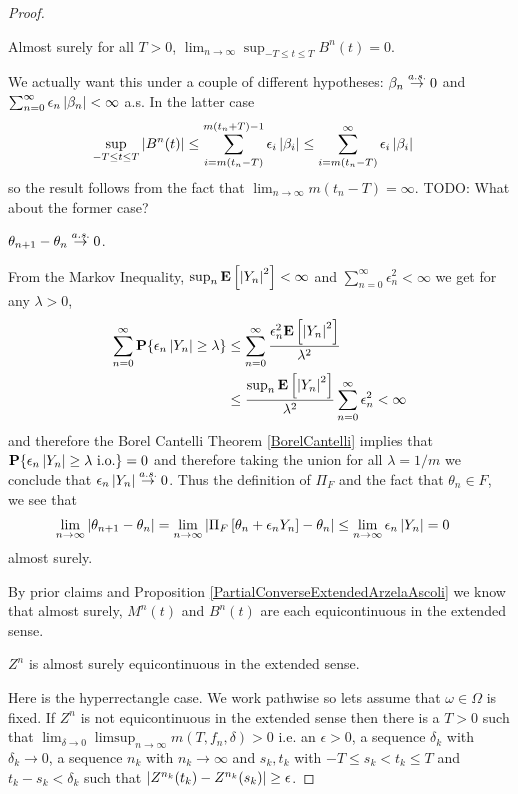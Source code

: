 \begin{proof}
\begin{clm}Almost surely for all $T > 0$, $\lim_{n \to \infty} \sup_{-T \leq t \leq T} B^n(t) = 0$.
\end{clm}

We actually want this under a couple of different hypotheses: $\beta_n \overset{a.s.}\to 0$ and $\sum_{n=0}^\infty \epsilon_n \left \vert \beta_n \right \vert < \infty$ a.s.  In the latter case 
\begin{align*}
\sup_{-T \leq t \leq T} \left \vert B^n(t) \right \vert &\leq \sum_{i=m(t_n -T)}^{m(t_n+T) -1} \epsilon_i \left \vert \beta_i \right \vert \leq \sum_{i=m(t_n -T)}^{\infty} \epsilon_i \left \vert \beta_i \right \vert 
\end{align*}
so the result follows from the fact that $\lim_{n \to \infty} m(t_n -T) = \infty$.  TODO: What about the former case?

\begin{clm}$\theta_{n+1} - \theta_n \overset{a.s.}\to 0$.
\end{clm}
From the Markov Inequality, $\sup_n \textbf{E}\left[\left \vert Y_n \right \vert^2\right] < \infty$ and $\sum_{n=0}^\infty \epsilon_n^2 <\infty$ we get for any $\lambda > 0$,
\begin{align*}
\sum_{n=0}^\infty \textbf{P}\{\epsilon_n \left \vert Y_n \right \vert \geq \lambda\} &\leq 
\sum_{n=0}^\infty \frac{\epsilon_n^2 \textbf{E}\left[\left \vert Y_n \right \vert^2\right]}{\lambda^2} \\
&\leq \frac{\sup_n \textbf{E}\left[\left \vert Y_n \right \vert^2\right]}{\lambda^2} \sum_{n=0}^\infty \epsilon_n^2  < \infty
\end{align*}
and therefore the Borel Cantelli Theorem \ref{BorelCantelli} implies that $\textbf{P}\{\epsilon_n \left \vert Y_n \right \vert \geq \lambda \text{ i.o.}\} = 0$ and therefore taking the union
for all $\lambda = 1/m$ we conclude that $\epsilon_n \left \vert Y_n \right \vert \overset{a.s.}\to 0$.  Thus the definition of $\Pi_F$ and the fact that $\theta_n \in F$, we see that
\begin{align*}
\lim_{n \to \infty} \left \vert \theta_{n+1} - \theta_n  \right \vert&= \lim_{n \to \infty} \left \vert  \Pi_F \left[ \theta_n + \epsilon_n Y_n \right] - \theta_n  \right \vert 
\leq \lim_{n \to \infty} \epsilon_n \left \vert  Y_n \right \vert  = 0
\end{align*}
almost surely.


By prior claims and Proposition \ref{PartialConverseExtendedArzelaAscoli} we know that almost surely, $M^n(t)$ and $B^n(t)$ are each equicontinuous in the extended sense. 

\begin{clm}$Z^n$ is almost surely equicontinuous in the extended sense.
\end{clm}
Here is the hyperrectangle case.  We work pathwise so lets assume that $\omega \in \Omega$ is fixed.  If $Z^n$ is not equicontinuous in the extended sense then there is a $T > 0$ such that $\lim_{\delta \to 0} \limsup_{n \to \infty} m(T, f_n, \delta) > 0$ i.e. an $\epsilon > 0$, a sequence $\delta_k$ with $\delta_k \to 0$, a sequence $n_k$ with $n_k \to \infty$ and $s_k, t_k$ with $-T \leq s_k < t_k \leq T$ and $t_k - s_k < \delta_k$ such that $\left \vert Z^{n_k}(t_k) - Z^{n_k}(s_k) \right \vert \geq \epsilon$.  


\end{proof}
